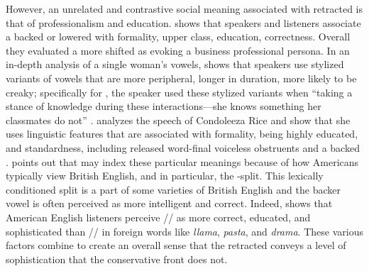 However, an unrelated and contrastive social meaning associated with retracted \bat is that of professionalism and education. \citet[47]{donofrio_2016_diss} shows that speakers and listeners associate a backed or lowered \bat with formality, upper class, education, correctness. Overall they evaluated a more shifted \bat as evoking a business professional persona. In an in-depth analysis of a single woman's vowels, \citet{vanhofwegen_2017_diss} shows that speakers use stylized variants of vowels that are more peripheral, longer in duration, more likely to be creaky; specifically for \bat, the speaker used these stylized variants when ``taking a stance of knowledge during these interactions---she knows something her classmates do not'' \citeyearpar[149]{vanhofwegen_2017_diss}. \citet{podesva_etal_2012} analyzes the speech of Condoleeza Rice and show that she uses linguistic features that are associated with formality, being highly educated, and standardness, including released word-final voiceless obstruents and a backed \bat. \citet{donofrio_2018} points out that \bat may index these particular meanings because of how Americans typically view British English, and in particular, the \trap-\bath split. This lexically conditioned split is a part of some varieties of British English and the backer vowel is often perceived as more intelligent and correct. Indeed, \citet{boberg_1999} shows that American English listeners perceive // as more correct, educated, and sophisticated than /\textipa{\ae}/ in foreign words like \textit{llama}, \textit{pasta}, and \textit{drama}. These various factors combine to create an overall sense that the retracted \bat conveys a level of sophistication that the conservative front \bat does not.

